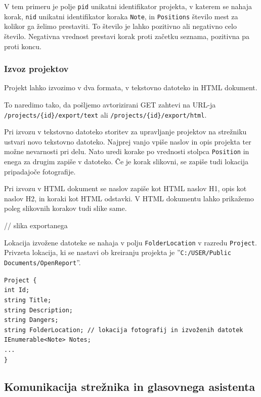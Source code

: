 \documentclass[a4paper, 12pt]{book}
\begin{document}
V tem primeru je polje \texttt{pid} unikatni identifikator projekta, v katerem se nahaja korak, \texttt{nid} unikatni identifikator koraka \texttt{Note}, in \texttt{Positions} število mest za kolikor ga želimo prestaviti.
To število je lahko pozitivno ali negativno celo število.
Negativna vrednost prestavi korak proti začetku seznama, pozitivna pa proti koncu.

\subsubsection{Izvoz projektov}

Projekt lahko izvozimo v dva formata, v tekstovno datoteko in HTML dokument.

To naredimo tako, da pošljemo avtorizirani GET zahtevi na URL-ja \texttt{/projects/\{id\}/export/text} ali \texttt{/projects/\{id\}/export/html}.

Pri izvozu v tekstovno datoteko storitev za upravljanje projektov na strežniku ustvari novo tekstovno datoteko.
Najprej vanjo vpiše naslov in opis projekta ter možne nevarnosti pri delu.
Nato uredi korake po vrednosti stolpca \texttt{Position} in enega za drugim zapiše v datoteko.
Če je korak slikovni, se zapiše tudi lokacija pripadajoče fotografije.

Pri izvozu v HTML dokument se naslov zapiše kot HTML naslov H1, opis kot naslov H2, in koraki kot HTML odstavki.
V HTML dokumentu lahko prikažemo poleg slikovnih korakov tudi slike same.

// slika exportanega 

Lokacija izvožene datoteke se nahaja v polju \texttt{FolderLocation} v razredu \texttt{Project}.
Privzeta lokacija, ki se nastavi ob kreiranju projekta je ''\texttt{C:/USER/Public Documents/OpenReport}''.

\noindent \texttt{Project \{ \\
int Id; \\
string Title; \\
string Description; \\
string Dangers; \\
string FolderLocation; // lokacija fotografij in izvoženih datotek \\
IEnumerable<Note> Notes; \\
... \\
\}
}

\subsection{Komunikacija strežnika in glasovnega asistenta}
\end{document}
